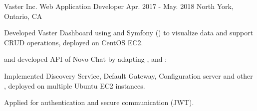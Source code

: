 \begin{cventries}
  \cventry
    {Vaster Inc.} %
    {Web Application Developer} %
    {Apr. 2017 - May. 2018} %
    {North York, Ontario, CA} %
    {
      \begin{cvitems} %
        \item {Developed Vaster Dashboard using  and Symfony () to visualize data and support CRUD operations, deployed on CentOS EC2.}
        \item { and developed  API of Novo Chat by adapting ,  and :}
          \begin{cvsubitems}
            \item {Implemented Discovery Service, Default Gateway, Configuration server and other , deployed on multiple Ubuntu EC2 instances.}
          \end{cvsubitems}
        \item {Applied  for authentication and  secure communication (JWT).}
      \end{cvitems}
    }

\end{cventries}
